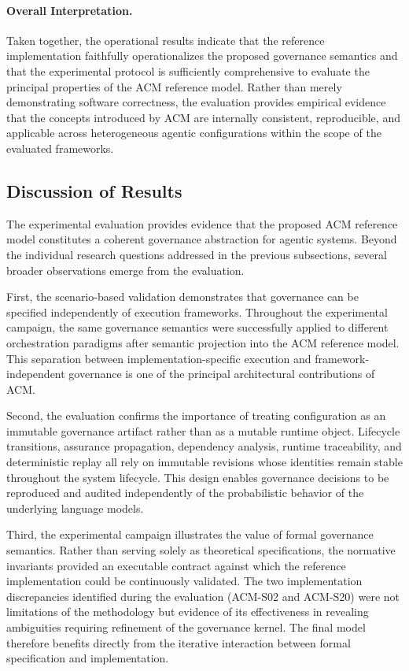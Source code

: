 \documentclass[10pt]{article}
\begin{document}
\paragraph{Overall Interpretation.}

Taken together, the operational results indicate that the reference
implementation faithfully operationalizes the proposed governance semantics and
that the experimental protocol is sufficiently comprehensive to evaluate the
principal properties of the ACM reference model. Rather than merely
demonstrating software correctness, the evaluation provides empirical evidence
that the concepts introduced by ACM are internally consistent, reproducible,
and applicable across heterogeneous agentic configurations within the scope of
the evaluated frameworks.

\subsection{Discussion of Results}
\label{subsec:discussion_results}

The experimental evaluation provides evidence that the proposed ACM reference
model constitutes a coherent governance abstraction for agentic systems. Beyond
the individual research questions addressed in the previous subsections, several
broader observations emerge from the evaluation.

First, the scenario-based validation demonstrates that governance can be
specified independently of execution frameworks. Throughout the experimental
campaign, the same governance semantics were successfully applied to different
orchestration paradigms after semantic projection into the ACM reference model.
This separation between implementation-specific execution and
framework-independent governance is one of the principal architectural
contributions of ACM.

Second, the evaluation confirms the importance of treating configuration as an
immutable governance artifact rather than as a mutable runtime object.
Lifecycle transitions, assurance propagation, dependency analysis, runtime
traceability, and deterministic replay all rely on immutable revisions whose
identities remain stable throughout the system lifecycle. This design enables
governance decisions to be reproduced and audited independently of the
probabilistic behavior of the underlying language models.

Third, the experimental campaign illustrates the value of formal governance
semantics. Rather than serving solely as theoretical specifications, the
normative invariants provided an executable contract against which the reference
implementation could be continuously validated. The two implementation
discrepancies identified during the evaluation (ACM-S02 and ACM-S20) were not
limitations of the methodology but evidence of its effectiveness in revealing
ambiguities requiring refinement of the governance kernel. The final model
therefore benefits directly from the iterative interaction between formal
specification and implementation.
\end{document}
